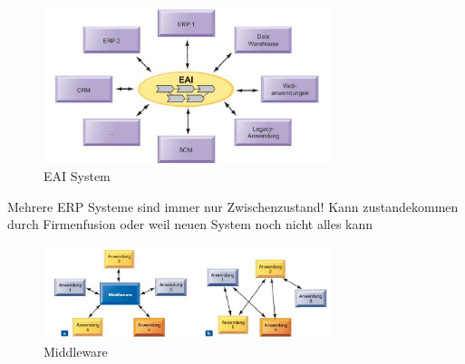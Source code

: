 \documentclass[ngerman,a4paper,12pt]{scrreprt}
\begin{document}

\begin{figure}[H]
	\centering
	\includegraphics[width=0.75\textwidth]{img/V9.6.jpg}
	\caption{EAI System}
	\label{}
\end{figure}

\ul
	\li Mehrere ERP Systeme sind immer nur Zwischenzustand!
	\li Kann zustandekommen durch Firmenfusion oder weil neuen System noch nicht alles kann
\ulE


\begin{figure}[H]
	\centering
	\includegraphics[width=0.75\textwidth]{img/V9.7.jpg}
	\caption{Middleware}
	\label{}
\end{figure}
\end{document}
